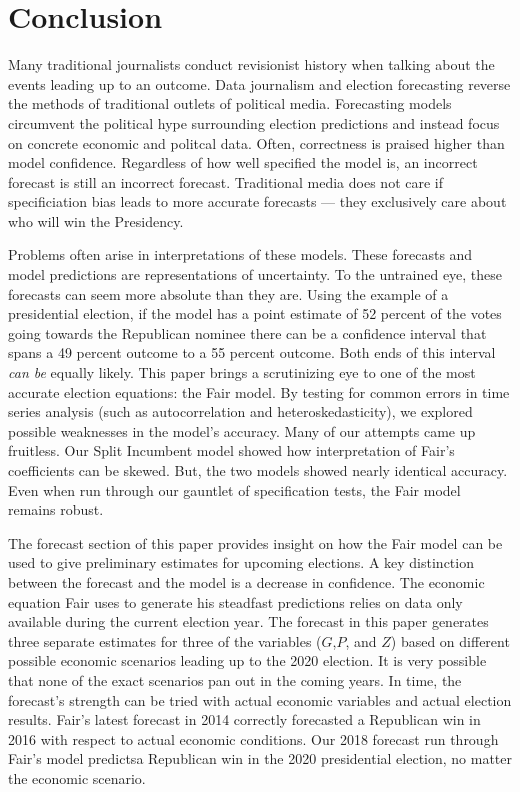 \documentclass[11,]{article}
\begin{document}
\hypertarget{conclusion}{%
\section{Conclusion}\label{conclusion}}

Many traditional journalists conduct revisionist history when talking
about the events leading up to an outcome. Data journalism and election
forecasting reverse the methods of traditional outlets of political
media. Forecasting models circumvent the political hype surrounding
election predictions and instead focus on concrete economic and politcal
data. Often, correctness is praised higher than model confidence.
Regardless of how well specified the model is, an incorrect forecast is
still an incorrect forecast. Traditional media does not care if
specificiation bias leads to more accurate forecasts --- they
exclusively care about who will win the Presidency.

Problems often arise in interpretations of these models. These forecasts
and model predictions are representations of uncertainty. To the
untrained eye, these forecasts can seem more absolute than they are.
Using the example of a presidential election, if the model has a point
estimate of 52 percent of the votes going towards the Republican nominee
there can be a confidence interval that spans a 49 percent outcome to a
55 percent outcome. Both ends of this interval \emph{can be} equally
likely. This paper brings a scrutinizing eye to one of the most accurate
election equations: the Fair model. By testing for common errors in time
series analysis (such as autocorrelation and heteroskedasticity), we
explored possible weaknesses in the model's accuracy. Many of our
attempts came up fruitless. Our Split Incumbent model showed how
interpretation of Fair's coefficients can be skewed. But, the two models
showed nearly identical accuracy. Even when run through our gauntlet of
specification tests, the Fair model remains robust.

The forecast section of this paper provides insight on how the Fair
model can be used to give preliminary estimates for upcoming elections.
A key distinction between the forecast and the model is a decrease in
confidence. The economic equation Fair uses to generate his steadfast
predictions relies on data only available during the current election
year. The forecast in this paper generates three separate estimates for
three of the variables (\(G\),\(P\), and \(Z\)) based on different
possible economic scenarios leading up to the 2020 election. It is very
possible that none of the exact scenarios pan out in the coming years.
In time, the forecast's strength can be tried with actual economic
variables and actual election results. Fair's latest forecast in 2014
correctly forecasted a Republican win in 2016 with respect to actual
economic conditions. Our 2018 forecast run through Fair's model
predictsa Republican win in the 2020 presidential election, no matter
the economic scenario.
\end{document}
